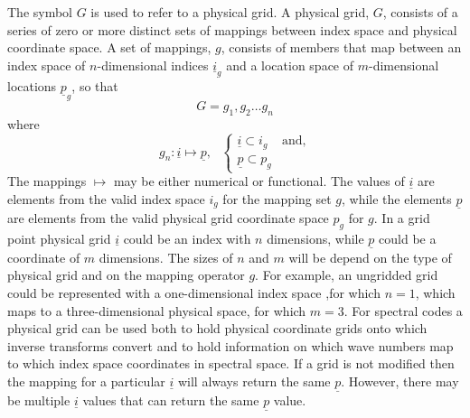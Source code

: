 The symbol $G$ is used to refer to a physical grid. A physical grid, $G$, 
consists of a series of zero or more distinct sets of mappings between index space
and physical coordinate space. A set of mappings, $g$, consists of members
that map between an index space of $n$-dimensional indices
$\underline{i}_{g}$ and a location space of 
$m$-dimensional locations $\underline{p}_{g}$, so that
\begin{equation}
G = g_{1}, g_{2} \ldots g_{n}
\end{equation}
\noindent where
\begin{equation}
g_{n}: \underline{i} \mapsto \underline{p},~~~
\begin{cases}
  \underline{i} \subset i_{g} & \text{and}, \\
  \underline{p} \subset p_{g} & \text{}
\end{cases}
\end{equation}
The mappings $\mapsto$ may be either numerical or functional.
The values of $\underline{i}$ are elements from the valid index space
$i_{g}$ for the mapping set $g$, while the elements $\underline{p}$ are elements
from the valid physical grid coordinate space $p_{g}$ for $g$.
In a grid point physical grid $\underline{i}$ could be
an index with $n$ dimensions, while $\underline{p}$ could
be a coordinate of $m$ dimensions. The sizes of 
$n$ and $m$ will be depend on the type of physical 
grid and on the mapping operator $g$. For example, an ungridded 
grid could be represented with a one-dimensional index space
,for which $n=1$,
which maps to a three-dimensional physical space, for which $m=3$.
For spectral codes a physical grid can be used both
to hold physical coordinate grids onto which inverse transforms
convert and to hold information on which wave numbers map
to which index space coordinates in spectral space.
If a grid is not modified then the mapping for a particular
$\underline{i}$ will always return the same $\underline{p}$.
However, there may be multiple $\underline{i}$ values that
can return the same $\underline{p}$ value.
